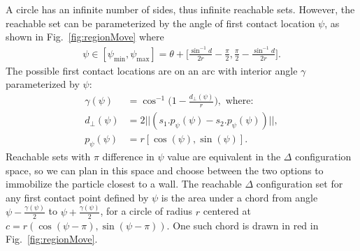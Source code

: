 A circle has an infinite number of sides, thus infinite reachable sets. However, the reachable set can be parameterized by the angle of first contact location $\psi$, as shown in Fig.~\ref{fig:regionMove} where 
\begin{align}
 \psi \in [\psi_{\min}, \psi_{\max}]= \theta + \Big[\frac{\sin^{-1}{d}}{2r} - \frac{\pi}{2},  \frac{\pi}{2} -\frac{\sin^{-1}{d}}{2r} \Big].
\end{align}
The possible first contact locations are on an arc with interior angle $\gamma$ parameterized by $\psi$:
\begin{align}\label{eq:gamma}
\gamma(\psi) &= \cos^{-1} \Big(1-\frac{d_\perp(\psi)}{r} \Big), \textrm{ where:}\\ \label{eq:dprep}
d_\perp(\psi)&= 2 ||(s_1.p_\psi(\psi) - s_2.p_\psi(\psi))||,\\ \label{eq:ppsi}
p_\psi(\psi) &= r[\cos(\psi ), \sin(\psi )].
\end{align} 
Reachable sets with $\pi$ difference in $\psi$ value are equivalent in the  $\Delta$ configuration space, so we can plan in this space and choose between the two options to immobilize the particle closest to a wall. 
The reachable $\Delta$ configuration set for any first contact point defined by $\psi$ is the area under a chord from angle $\psi- \frac{\gamma(\psi)}{2}$ to $\psi+ \frac{\gamma(\psi)}{2}$, for a circle of radius $r$ centered at $c = r(\cos(\psi-\pi), \sin(\psi-\pi))$. One such chord is drawn in red in Fig.~\ref{fig:regionMove}.


